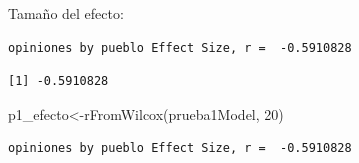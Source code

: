 \documentclass[
  ignorenonframetext,
]{beamer}
\newenvironment{Shaded}{\begin{snugshade}}{\end{snugshade}}
\newcommand{\CommentTok}[1]{\textcolor[rgb]{0.37,0.37,0.37}{#1}}
\newcommand{\ControlFlowTok}[1]{\textcolor[rgb]{0.00,0.23,0.31}{\textbf{#1}}}
\newcommand{\DecValTok}[1]{\textcolor[rgb]{0.68,0.00,0.00}{#1}}
\newcommand{\FunctionTok}[1]{\textcolor[rgb]{0.28,0.35,0.67}{#1}}
\newcommand{\NormalTok}[1]{\textcolor[rgb]{0.00,0.23,0.31}{#1}}
\newcommand{\OtherTok}[1]{\textcolor[rgb]{0.00,0.23,0.31}{#1}}
\newcommand{\SpecialCharTok}[1]{\textcolor[rgb]{0.37,0.37,0.37}{#1}}
\newcommand{\StringTok}[1]{\textcolor[rgb]{0.13,0.47,0.30}{#1}}
\begin{document}
\begin{frame}[fragile]
\begin{block}{Tamaño del efecto:}
\label{tamauxf1o-del-efecto}
\begin{Shaded}
\end{Shaded}

\begin{verbatim}
opiniones by pueblo Effect Size, r =  -0.5910828
\end{verbatim}

\begin{verbatim}
[1] -0.5910828
\end{verbatim}

\begin{Shaded}
\begin{Highlighting}[]
\NormalTok{p1\_efecto}\OtherTok{\textless{}{-}}\FunctionTok{rFromWilcox}\NormalTok{(prueba1Model, }\DecValTok{20}\NormalTok{)}
\end{Highlighting}
\end{Shaded}

\begin{verbatim}
opiniones by pueblo Effect Size, r =  -0.5910828
\end{verbatim}
\end{block}
\end{frame}
\end{document}
